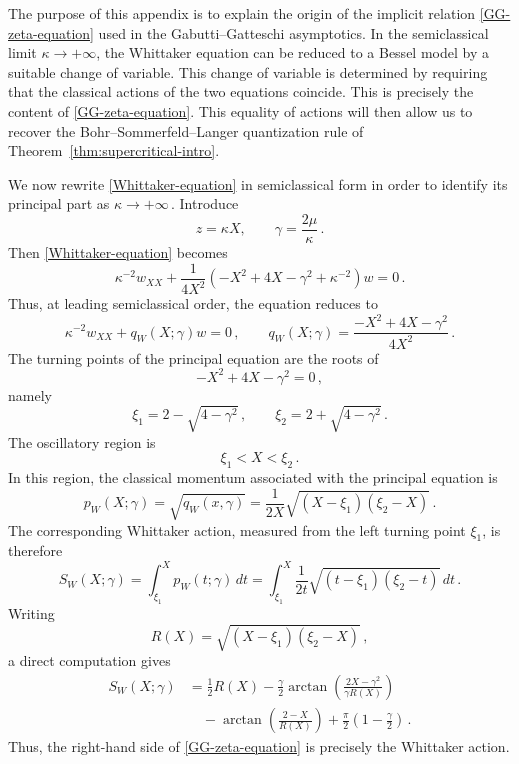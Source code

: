\documentclass[11pt]{amsart}
\numberwithin{equation}{section}
\theoremstyle{remark}
\newcommand{\mn}{\medskip\noindent}
\begin{document}
\mn
The purpose of this appendix is to explain the origin of the implicit
relation \eqref{GG-zeta-equation} used in the Gabutti--Gatteschi
asymptotics. In the semiclassical limit
$\kappa\to+\infty$, the Whittaker equation can be reduced to a Bessel
model by a suitable change of variable. This change of variable is
determined by requiring that the classical actions of the two
equations coincide. This is precisely the content of
\eqref{GG-zeta-equation}. This equality of actions will then allow us
to recover the Bohr--Sommerfeld--Langer quantization rule of
Theorem~\ref{thm:supercritical-intro}.



\mn
We now rewrite \eqref{Whittaker-equation} in semiclassical form in
order to identify its principal part as $\kappa\to+\infty\,$.
Introduce
\begin{equation}\label{Whittaker-scaling}
z=\kappa X,
\qquad
\gamma=\frac{2\mu}{\kappa}\,.
\end{equation}
Then \eqref{Whittaker-equation} becomes
\begin{equation}\label{scaled-Whittaker-equation}
\kappa^{-2}w_{XX}
+
\frac{1}{4X^2}
\left(
-X^2+4X-\gamma^2+\kappa^{-2}
\right)w
=
0\,.
\end{equation}
Thus, at leading semiclassical order, the equation reduces to
\begin{equation}\label{principal-Whittaker-equation}
\kappa^{-2}w_{XX}
+
q_W(X;\gamma)w
=
0\,,
\qquad
q_W(X;\gamma)
=
\frac{-X^2+4X-\gamma^2}{4X^2}\,.
\end{equation}
The turning points of the principal equation are the roots of
\[
-X^2+4X-\gamma^2=0\,,
\]
namely
\[
\xi_1=2-\sqrt{4-\gamma^2}\,,
\qquad
\xi_2=2+\sqrt{4-\gamma^2}\,.
\]
The oscillatory region is
\[
\xi_1<X<\xi_2\,.
\]
In this region, the classical momentum associated with the principal
equation is
\begin{equation}\label{Whittaker-momentum}
p_W(X;\gamma)
=
\sqrt{q_W(x, \gamma)}
=
\frac{1}{2X}
\sqrt{(X-\xi_1)(\xi_2-X)}\,.
\end{equation}
The corresponding Whittaker action, measured from the left turning
point $\xi_1$, is therefore
\begin{equation}\label{Whittaker-action-def}
S_W(X;\gamma)
=
\int_{\xi_1}^{X}p_W(t;\gamma)\,dt
=
\int_{\xi_1}^{X}
\frac{1}{2t}
\sqrt{(t-\xi_1)(\xi_2-t)}\,dt\,.
\end{equation}
Writing
\[
R(X)=\sqrt{(X-\xi_1)(\xi_2-X)}\,,
\]
a direct computation gives
\begin{align}
S_W(X;\gamma)
&=
\frac12R(X)
-\frac{\gamma}{2}
\arctan\left(
\frac{2X-\gamma^2}{\gamma R(X)}
\right)
\nonumber\\
&\quad
-\arctan\left(
\frac{2-X}{R(X)}
\right)
+
\frac{\pi}{2}
\left(1-\frac{\gamma}{2}\right)\,.
\label{Whittaker-action-explicit}
\end{align}
Thus, the right-hand side of \eqref{GG-zeta-equation} is precisely
the Whittaker action.
\end{document}
